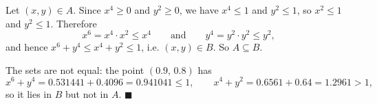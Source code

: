 Let $(x,y)\in A$. Since $x^4\ge0$ and $y^2\ge0$, we have $x^4\le1$ and $y^2\le1$, so $x^2\le1$ and $y^2\le1$. Therefore
\[x^6=x^4\cdot x^2\le x^4\qquad\text{and}\qquad y^4=y^2\cdot y^2\le y^2,\]
and hence $x^6+y^4\le x^4+y^2\le1$, i.e. $(x,y)\in B$. So $A\subseteq B$.

The sets are not equal: the point $(0.9,\,0.8)$ has
\[x^6+y^4=0.531441+0.4096=0.941041\le1,\qquad x^4+y^2=0.6561+0.64=1.2961>1,\]
so it lies in $B$ but not in $A$. $\blacksquare$
